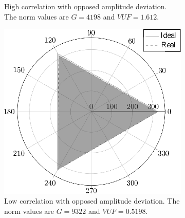 \begin{figure}
\begin{subfigure}[b]{0.48\textwidth}
                    \caption{\centering High correlation with opposed amplitude deviation. The norm values are $G=4198$ and $VUF=1.612$.}
                    \label{fig:cases_B}
                \end{subfigure}
                \begin{subfigure}[b]{0.48\textwidth}
                    \includegraphics[width=\textwidth]{Unblance_EPS_Pics/EPS_images/square.eps}
                    \caption{Low correlation with opposed amplitude deviation. The norm values are $G=9322$ and $VUF=0.5198$.}
                    \label{fig:cases_C}
                \end{subfigure}
                ~
                \begin{subfigure}[b]{0.48\textwidth}

\end{subfigure}
\end{figure}
